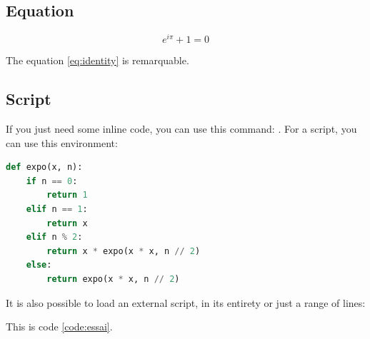 \subsection{Equation}

\begin{equation}
    e^{i \pi} + 1 = 0
    \label{eq:identity}
\end{equation}

The equation \ref{eq:identity} is remarquable.

\subsection{Script}

If you just need some inline code, you can use this command:
. For a script, you can use this environment:

\begin{lstlisting}[language=Python, caption=A fast exponentation]
def expo(x, n):
    if n == 0:
        return 1
    elif n == 1:
        return x
    elif n % 2:
        return x * expo(x * x, n // 2)
    else:
        return expo(x * x, n // 2)
\end{lstlisting}

It is also possible to load an external script, in its entirety or just a range
of lines:





This is code \ref{code:essai}.
